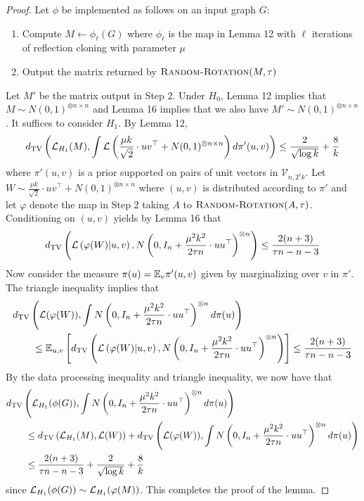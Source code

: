 \documentclass[11pt]{article}
\begin{document}
\begin{proof}
Let $\phi$ be implemented as follows on an input graph $G$:
\begin{enumerate}
\item Compute $M \gets \phi_\ell(G)$ where $\phi_\ell$ is the map in Lemma 12 with $\ell$ iterations of reflection cloning with parameter $\mu$
\item Output the matrix returned by $\textsc{Random-Rotation}(M, \tau)$
\end{enumerate}
Let $M'$ be the matrix output in Step 2. Under $H_0$, Lemma 12 implies that $M \sim N(0, 1)^{\otimes n \times n}$ and Lemma 16 implies that we also have $M' \sim N(0, 1)^{\otimes n \times n}$. It suffices to consider $H_1$. By Lemma 12, 
$$d_{\text{TV}}\left( \mathcal{L}_{H_1}(M), \int \mathcal{L}\left( \frac{\mu k}{\sqrt{2}} \cdot  uv^\top + N(0, 1)^{\otimes n \times n} \right) d\pi'(u, v) \right) \le \frac{2}{\sqrt{\log k}} + \frac{8}{k}$$
where $\pi'(u, v)$ is a prior supported on pairs of unit vectors in $\mathcal{V}_{n, 2^\ell k}$. Let $W \sim \frac{\mu k}{\sqrt{2}} \cdot  uv^\top + N(0, 1)^{\otimes n \times n}$ where $(u, v)$ is distributed according to $\pi'$ and let $\varphi$ denote the map in Step 2 taking $A$ to $\textsc{Random-Rotation}(A, \tau)$. Conditioning on $(u, v)$ yields by Lemma 16 that
$$d_{\text{TV}}\left( \mathcal{L}\left( \varphi(W) | u, v \right), N\left(0, I_n + \frac{\mu^2 k^2}{2 \tau n} \cdot uu^\top\right)^{\otimes n} \right) \le \frac{2(n + 3)}{\tau n - n - 3}$$
Now consider the measure $\pi(u) = \mathbb{E}_{v} \pi'(u, v)$ given by marginalizing over $v$ in $\pi'$. The triangle inequality implies that
\begin{align*}
&d_{\text{TV}}\left( \mathcal{L}(\varphi(W)), \int N\left(0, I_n + \frac{\mu^2 k^2}{2 \tau n} \cdot uu^\top\right)^{\otimes n} d\pi(u) \right) \\
&\quad \quad \le \mathbb{E}_{u, v} \left[ d_{\text{TV}}\left( \mathcal{L}\left( \varphi(W) | u, v \right), N\left(0, I_n + \frac{\mu^2 k^2}{2 \tau n} \cdot uu^\top\right)^{\otimes n} \right) \right] \le \frac{2(n + 3)}{\tau n - n - 3}
\end{align*}
By the data processing inequality and triangle inequality, we now have that
\begin{align*}
&d_{\text{TV}}\left( \mathcal{L}_{H_1}(\phi(G)), \int N\left(0, I_n + \frac{\mu^2 k^2}{2 \tau n} \cdot uu^\top\right)^{\otimes n} d\pi(u) \right) \\
&\quad \quad \le d_{\text{TV}}\left( \mathcal{L}_{H_1}(M), \mathcal{L}(W) \right) + d_{\text{TV}}\left( \mathcal{L}(\varphi(W)), \int N\left(0, I_n + \frac{\mu^2 k^2}{2 \tau n} \cdot uu^\top\right)^{\otimes n} d\pi(u) \right) \\
&\quad \quad \le \frac{2(n + 3)}{\tau n - n - 3} + \frac{2}{\sqrt{\log k}} + \frac{8}{k}
\end{align*}
since $\mathcal{L}_{H_1}(\phi(G)) \sim \mathcal{L}_{H_1}(\varphi(M))$. This completes the proof of the lemma.
\end{proof}
\end{document}
